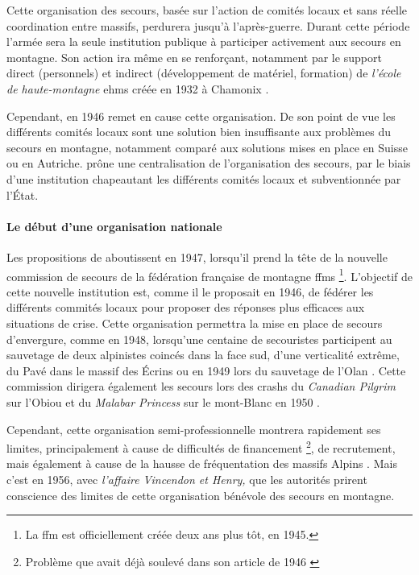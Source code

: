 Cette organisation des secours, basée sur l'action de comités locaux
et sans réelle coordination entre massifs, perdurera jusqu'à
l'après-guerre. Durant cette période l'armée sera la seule institution
publique à participer activement aux secours en montagne. Son action
ira même en se renforçant, notamment par le support direct
(personnels) et indirect (développement de matériel, formation) de
\emph{l'école de haute-montagne} \acp{ehm} créée en 1932 à Chamonix
\autocite{Mezin2016}.

Cependant, en 1946 \textcite{Devies1946} remet en cause cette
organisation. De son point de vue les différents comités locaux sont
une solution bien insuffisante aux problèmes du secours en montagne,
notamment comparé aux solutions mises en place en Suisse ou en
Autriche.  prône une centralisation de l'organisation des
secours, par le biais d'une institution chapeautant les différents
comités locaux et subventionnée par l'État.

\paragraph{Le début d'une organisation nationale}

Les propositions de  aboutissent en 1947, lorsqu'il prend
la tête de la nouvelle commission de secours de la fédération
française de montagne \acp{ffm} \footnote{La \ac{ffm} est
  officiellement créée deux ans plus tôt, en 1945.}. L'objectif de
cette nouvelle institution est, comme il le proposait en 1946, de
fédérer les différents commités locaux pour proposer des réponses plus
efficaces aux situations de crise. Cette organisation permettra la
mise en place de secours d'envergure, comme en 1948, lorsqu'une
centaine de secouristes participent au sauvetage de deux alpinistes
coincés dans la face sud, d'une verticalité extrême, du Pavé dans le
massif des Écrins \autocite{Romanaz2018} ou en 1949 lors du sauvetage
de l'Olan \autocite{Mollaret1993}. Cette commission dirigera également
les secours lors des crashs du \emph{Canadian Pilgrim} sur l'Obiou et
du \emph{Malabar Princess} sur le mont-Blanc en 1950
\autocite{CFDLD,Mollaret1993,SDSM2013}.

Cependant, cette organisation semi-professionnelle montrera rapidement
ses limites, principalement à cause de difficultés de financement
\footnote{Problème que  avait déjà soulevé dans son
  article de 1946 \autocite{Devies1946}}, de recrutement, mais
également à cause de la hausse de fréquentation des massifs Alpins
\autocite{CFDLD}. Mais c'est en 1956, avec \emph{l'affaire Vincendon
  et Henry,} que les autorités prirent conscience des limites de cette
organisation bénévole des secours en montagne.

